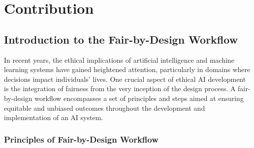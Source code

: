\documentclass[12pt,a4paper,openright,twoside]{book}
\begin{document}
%


\chapter{Contribution} %
\label{chap:contribution}

\section{Introduction to the Fair-by-Design Workflow}

In recent years, the ethical implications of artificial intelligence and machine learning systems have gained heightened attention, particularly in domains where decisions impact individuals' lives. One crucial aspect of ethical AI development is the integration of fairness from the very inception of the design process. A fair-by-design workflow encompasses a set of principles and steps aimed at ensuring equitable and unbiased outcomes throughout the development and implementation of an AI system.

\subsection{Principles of Fair-by-Design Workflow}
\end{document}
